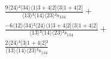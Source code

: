 \documentclass[varwidth, border=5pt]{standalone}
\begin{document}
\begin{my}
$\begin{gathered}
\scriptscriptstyle\frac{9⟨24⟩²⟨34⟩⟨1|3+4|2]⟨3|1+4|2]}{⟨13⟩²⟨14⟩⟨23⟩²s_{134}} +\\
\scriptscriptstyle\frac{-6⟨12⟩⟨34⟩²⟨24⟩⟨1|3+4|2]⟨3|1+4|2]}{⟨13⟩³⟨14⟩⟨23⟩²s_{134}} +\\
\scriptscriptstyle\frac{2⟨24⟩³⟨3|1+4|2]²}{⟨13⟩⟨14⟩⟨23⟩³s_{134}} \phantom{+}
\end{gathered}$
\end{my}
\end{document}
